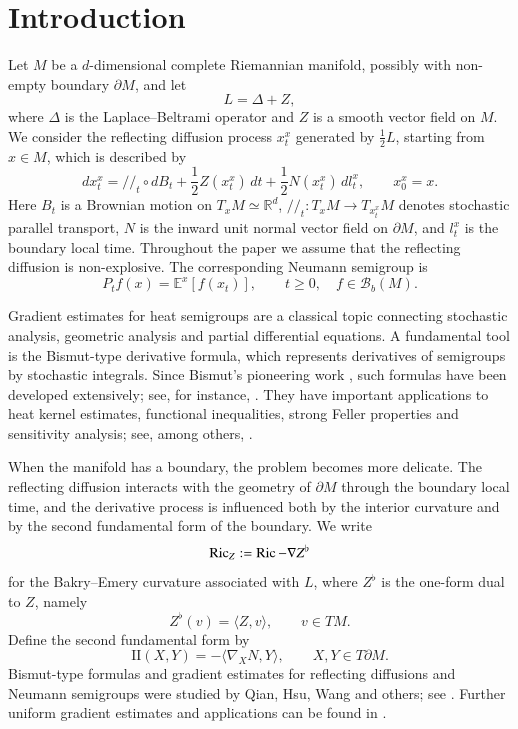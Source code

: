 \documentclass[11pt,twoside, reqno]{article}
\def\mathpal#1{\mathop{\mathchoice{\text{\rm #1}}%
   {\text{\rm #1}}{\text{\rm #1}}%
   {\text{\rm #1}}}\nolimits}
\newcommand\Ric{\mathpal{Ric}}
\newcommand\1{\mathbbm{1}}
\newcommand\II{\mathrm{II}}
\theoremstyle{definition}
\numberwithin{equation}{section}
\begin{document}
\section{Introduction}

Let \(M\) be a \(d\)-dimensional complete Riemannian manifold, possibly with
non-empty boundary \(\partial M\), and let
\[
        L=\Delta+Z,
\]
where \(\Delta\) is the Laplace--Beltrami operator and \(Z\) is a smooth vector
field on \(M\). We consider the reflecting diffusion process \(x_t^x\)
generated by \(\frac12L\), starting from \(x\in M\), which is described by
\[
        dx_t^x
        =
        /\!/_{t}\circ dB_t
        +
        \frac12 Z(x_t^x)\,dt
        +
        \frac12 N(x_t^x)\,dl_t^x,
        \qquad
        x_0^x=x.
\]
Here \(B_t\) is a Brownian motion on \(T_xM\simeq\mathbb R^d\),
\(/\!/_{t}:T_xM\to T_{x_t^x}M\) denotes stochastic parallel transport,
\(N\) is the inward unit normal vector field on \(\partial M\), and \(l_t^x\)
is the boundary local time. Throughout the paper we assume that the reflecting
diffusion is non-explosive. The corresponding Neumann semigroup is
\[
        P_tf(x)=\mathbb E^x[f(x_t)],
        \qquad
        t\geq0,\quad f\in\mathcal B_b(M).
\]

Gradient estimates for heat semigroups are a classical topic connecting
stochastic analysis, geometric analysis and partial differential equations.
A fundamental tool is the Bismut-type derivative formula, which represents
derivatives of semigroups by stochastic integrals. Since Bismut's pioneering
work \cite{Bismut:1984}, such formulas have been developed extensively; see,
for instance,
\cite{EL94,Tha97,DTh2001,APT2003,St00,StT98}. They have important
applications to heat kernel estimates, functional inequalities, strong Feller
properties and sensitivity analysis; see, among others,
\cite{BBM2007,GW12,PZ95,WZh13}.

When the manifold has a boundary, the problem becomes more delicate. The
reflecting diffusion interacts with the geometry of \(\partial M\) through
the boundary local time, and the derivative process is influenced both by the
interior curvature and by the second fundamental form of the boundary. We write
\[
        \Ric_Z:=\Ric-\nabla Z^\flat
\]
for the Bakry--Emery curvature associated with \(L\), where \(Z^\flat\) is the one-form dual to \(Z\), namely
\[Z^\flat(v)=\langle Z,v\rangle,\qquad v\in TM.\] 
Define the second
fundamental form by
\[
        \II(X,Y)=-\langle\nabla_XN,Y\rangle,
        \qquad X,Y\in T\partial M .
\]
Bismut-type formulas and gradient estimates for reflecting diffusions and
Neumann semigroups were studied by Qian, Hsu, Wang and others; see
\cite{Qian:1997,Hsu,Wang2009SecondFundamentalForm,Wbook14}. Further uniform
gradient estimates and applications can be found in
\cite{Cheng_Thalmaier_Thompson:2018}.
\end{document}
